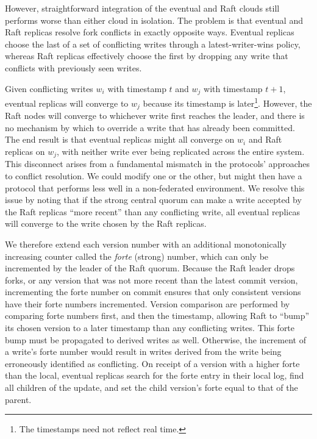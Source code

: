 \documentclass[10pt,conference,letterpaper]{IEEEtran}
\begin{document}
However, straightforward integration of the eventual and Raft clouds still
performs worse than either cloud in isolation.
The problem is that eventual and Raft replicas resolve fork conflicts in
exactly opposite ways.
Eventual replicas choose the last of a set of conflicting writes through a
latest-writer-wins policy, whereas Raft replicas effectively choose the first
by dropping any write that conflicts with previously seen writes.

Given conflicting writes $w_i$ with timestamp $t$ and $w_j$ with timestamp
$t+1$, eventual replicas will converge to $w_j$ because its timestamp is
later\footnote{The timestamps need not reflect real time.}.
However, the Raft nodes will converge to whichever write first reaches the
leader, and there is no mechanism by which to override a write that has already
been committed.
The end result is that eventual replicas might all converge on $w_i$ and
Raft replicas on $w_j$, with neither write ever being replicated across
the entire system.
This disconnect arises from a fundamental mismatch in the protocols'
approaches to conflict resolution.
We could modify one or the other, but might then have a protocol that performs
less well in a non-federated environment.
We resolve this issue by noting that if the strong central quorum can make a
write accepted by the Raft replicas ``more recent'' than any conflicting
write, all eventual replicas will converge to the write chosen by the Raft
replicas.

We therefore extend each version number with an additional monotonically
increasing counter called the \textit{forte} (strong) number, which can only
be incremented by the leader of the Raft quorum.
Because the Raft leader drops forks, or any version that was not more recent
than the latest commit version, incrementing the forte number on commit
ensures that only consistent versions have their forte numbers incremented.
Version comparison are performed by comparing forte
numbers first, and then the timestamp, allowing Raft to ``bump'' its chosen
version to a later timestamp than any conflicting writes.
This forte bump must be propagated to derived writes as well.
Otherwise, the increment of a write's forte number would result in writes
derived from the write being erroneously identified as conflicting.
On receipt of a version with a higher forte than the local, eventual replicas
search for the forte entry in their local log, find all children of the
update, and set the child version's forte equal to that of the parent.
\end{document}
